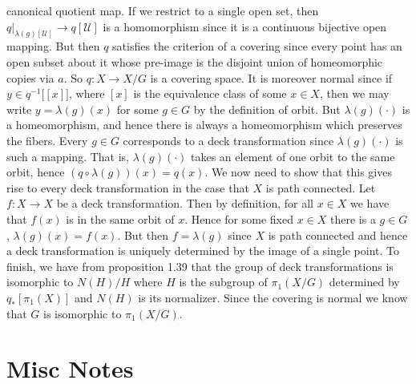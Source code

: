 \documentclass{book}                                                           %
\begin{document}
\begin{bproof}
    canonical quotient map. If we restrict to a single open set, then
    $q|_{\lambda(g)[\mathcal{U}]}\rightarrow{q}[\mathcal{U}]$ is a
    homomorphism since it is a continuous bijective open mapping. But then
    $q$ satisfies the criterion of a covering since every point has an open
    subset about it whose pre-image is the disjoint union of homeomorphic
    copies via $a$. So $q:X\rightarrow{X}/G$ is a covering space. It is
    moreover normal since if $y\in{q}^{\minus{1}}\big[[x]\big]$, where
    $[x]$ is the equivalence class of some $x\in{X}$, then we may write
    $y=\lambda(g)(x)$ for some $g\in{G}$ by the definition of orbit. But
    $\lambda(g)(\cdot)$ is a homeomorphism, and hence there is always a
    homeomorphism which preserves the fibers. Every $g\in{G}$ corresponds to
    a deck transformation since $\lambda(g)(\cdot)$ is such a mapping. That
    is, $\lambda(g)(\cdot)$ takes an element of one orbit to the same orbit,
    hence $(q\circ\lambda(g))(x)=q(x)$. We now need to show that this gives
    rise to every deck transformation in the case that $X$ is path connected.
    Let $f:X\rightarrow{X}$ be a deck transformation. Then by definition,
    for all $x\in{X}$ we have that $f(x)$ is in the same orbit of $x$. Hence
    for some fixed $x\in{X}$ there is a $g\in{G}$, $\lambda(g)(x)=f(x)$.
    But then $f=\lambda(g)$ since $X$ is path connected and hence a deck
    transformation is uniquely determined by the image of a single point.
    To finish, we have from proposition 1.39 that the group of deck transformations
    is isomorphic to $N(H)/H$ where $H$ is the subgroup of $\pi_{1}(X/G)$
    determined by $q_{*}[\pi_{1}(X)]$ and $N(H)$ is its normalizer. Since
    the covering is normal we know that $G$ is isomorphic to $\pi_{1}(X/G)$.
\end{bproof}
\chapter{Misc Notes}
    
            \par\hfill\par
    \clearpage
    
    

    \clearpage
    \printindex
\end{document}
